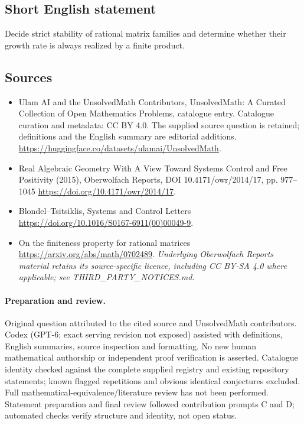 \documentclass[11pt]{article}
\begin{document}
\subsection{Short English statement}
Decide strict stability of rational matrix families and determine whether their growth rate is always realized by a finite product.
\subsection{Sources}
\begin{itemize}
\item[\hypertarget{source:statement:1}{S1}] Ulam AI and the UnsolvedMath Contributors, UnsolvedMath: A Curated Collection of Open Mathematics Problems, catalogue entry. Catalogue curation and metadata: CC BY 4.0. The supplied source question is retained; definitions and the English summary are editorial additions.
\url{https://huggingface.co/datasets/ulamai/UnsolvedMath}.
\item[\hypertarget{source:statement:2}{S2}] Real Algebraic Geometry With A View Toward Systems Control and Free Positivity (2015), Oberwolfach Reports, DOI 10.4171/owr/2014/17, pp. 977--1045
\url{https://doi.org/10.4171/owr/2014/17}.
\item[\hypertarget{source:statement:3}{S3}] Blondel--Tsitsiklis, Systems and Control Letters
\url{https://doi.org/10.1016/S0167-6911(00)00049-9}.
\item[\hypertarget{source:statement:4}{S4}] On the finiteness property for rational matrices
\url{https://arxiv.org/abs/math/0702489}.
\textit{Underlying Oberwolfach Reports material retains its source-specific licence, including CC BY-SA 4.0 where applicable; see THIRD\_PARTY\_NOTICES.md.}
\end{itemize}
\paragraph{Preparation and review.}
Original question attributed to the cited source and UnsolvedMath contributors. Codex (GPT-6; exact serving revision not exposed) assisted with definitions, English summaries, source inspection and formatting. No new human mathematical authorship or independent proof verification is asserted. Catalogue identity checked against the complete supplied registry and existing repository statements; known flagged repetitions and obvious identical conjectures excluded. Full mathematical-equivalence/literature review has not been performed. Statement preparation and final review followed contribution prompts C and D; automated checks verify structure and identity, not open status.
\label{end:statement}
\end{document}

